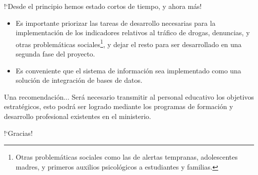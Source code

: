 \documentclass[xcolor=table, aspectratio=169]{beamer}
\begin{document}
\begin{frame}[t]{!`Desde el principio hemos estado cortos de tiempo, y ahora m\'as!}
	\begin{itemize}
		\item Es importante priorizar las tareas de desarrollo necesarias para la implementaci\'on de los indicadores relativos al tr\'afico de drogas, denuncias, y otras problem\'aticas sociales\footnote{Otras problem\'aticas sociales como las de alertas tempranas, adolescentes madres, y primeros auxilios psicol\'ogicos a estudiantes y familias.}, y dejar el resto para ser desarrollado en una segunda fase del proyecto.
		\item Es conveniente que el sistema de informaci\'on sea implementado como una soluci\'on de integraci\'on de bases de datos.
	\end{itemize}
	
	\begin{block}{Una recomendaci\'on...}
		Ser\'a necesario transmitir al personal educativo los objetivos estrat\'egicos, esto podr\'a ser logrado mediante los programas de formaci\'on y desarrollo profesional existentes en el ministerio.
	\end{block}
\end{frame}

\begin{frame}[plain, c]
	\begin{center}
		\Huge !`Gracias!
	\end{center}
\end{frame}
\end{document}
